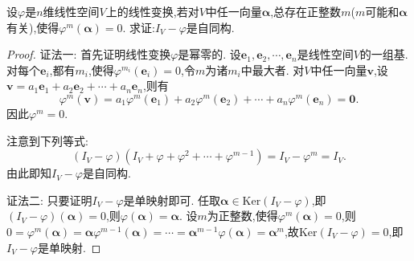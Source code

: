 \documentclass[../../main.tex]{subfiles}%
\begin{document}
\begin{example}
设\(\varphi\)是\(n\)维线性空间\(V\)上的线性变换,若对\(V\)中任一向量\(\boldsymbol{\alpha}\),总存在正整数\(m\)(\(m\)可能和\(\boldsymbol{\alpha}\)有关),使得\(\varphi^{m}(\boldsymbol{\alpha}) = 0\). 求证:\(I_V-\varphi\)是自同构.
\end{example}
\begin{proof}

{\color{blue}证法一:}
首先证明线性变换\(\varphi\)是幂零的. 设\(\boldsymbol{e}_1,\boldsymbol{e}_2,\cdots,\boldsymbol{e}_n\)是线性空间\(V\)的一组基. 对每个\(\boldsymbol{e}_i\),都有\(m_i\),使得\(\varphi^{m_i}(\boldsymbol{e}_i)=0\),令\(m\)为诸\(m_i\)中最大者. 对\(V\)中任一向量\(\boldsymbol{v}\),设\(\boldsymbol{v}=a_1\boldsymbol{e}_1 + a_2\boldsymbol{e}_2+\cdots + a_n\boldsymbol{e}_n\),则有
\[
\varphi^{m}(\boldsymbol{v})=a_1\varphi^{m}(\boldsymbol{e}_1)+a_2\varphi^{m}(\boldsymbol{e}_2)+\cdots + a_n\varphi^{m}(\boldsymbol{e}_n)=\boldsymbol{0}.
\]
因此\(\varphi^{m}=0\).

注意到下列等式:
\[
(I_V - \varphi)(I_V+\varphi+\varphi^{2}+\cdots+\varphi^{m - 1})=I_V-\varphi^{m}=I_V.
\]
由此即知\(I_V - \varphi\)是自同构.

{\color{blue}证法二:} 只要证明\(I_V - \varphi\)是单映射即可. 任取\(\boldsymbol{\alpha}\in\text{Ker}(I_V - \varphi)\),即\((I_V - \varphi)(\boldsymbol{\alpha}) = 0\),则\(\varphi(\boldsymbol{\alpha})=\boldsymbol{\alpha}\). 设\(m\)为正整数,使得\(\varphi^{m}(\boldsymbol{\alpha}) = 0\),则\(0=\varphi ^m(\boldsymbol{\alpha })=\boldsymbol{\alpha }\varphi ^{m-1}(\boldsymbol{\alpha })=\cdots =\boldsymbol{\alpha }^{m-1}\varphi (\boldsymbol{\alpha })=\boldsymbol{\alpha }^m\),故\(\text{Ker}(I_V - \varphi)=0\),即\(I_V - \varphi\)是单映射. 
\end{proof}
\end{document}

